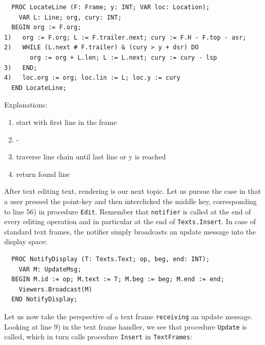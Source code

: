 \begin{verbatim}
  PROC LocateLine (F: Frame; y: INT; VAR loc: Location);
    VAR L: Line; org, cury: INT;
  BEGIN org := F.org;
1)   org := F.org; L := F.trailer.next; cury := F.H - F.top - asr;
2)   WHILE (L.next # F.trailer) & (cury > y + dsr) DO
       org := org + L.len; L := L.next; cury := cury - lsp
3)   END;
4)   loc.org := org; loc.lin := L; loc.y := cury
  END LocateLine;
\end{verbatim}

Explanations:
\begin{enumerate}
  \item start with first line in the frame
  \item -
  \item traverse line chain until last line or y is reached
  \item return found line
\end{enumerate}

After text editing text, rendering is our next topic. Let us pursue the case in that a user pressed
the point-key and then interclicked the middle key, corresponding to line 56) in procedure \verb|Edit|.
Remember that \verb|notifier| is called at the end of every editing operation and in particular at
the end of \verb|Texts.Insert|. In case of standard text frames, the notifier simply broadcasts an
update message into the display space:
\begin{verbatim}
  PROC NotifyDisplay (T: Texts.Text; op, beg, end: INT);
    VAR M: UpdateMsg;
  BEGIN M.id := op; M.text := T; M.beg := beg; M.end := end;
    Viewers.Broadcast(M)
  END NotifyDisplay;
\end{verbatim}

Let us now take the perspective of a text frame \verb|receiving| an update message. Looking at line 9)
in the text frame handler, we see that procedure \verb|Update| is called, which in turn calls procedure
\verb|Insert| in \verb|TextFrames|:


